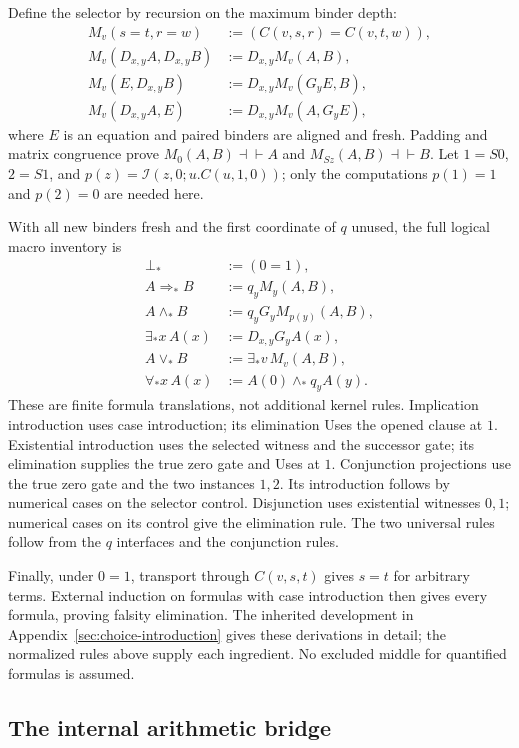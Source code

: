 \documentclass[11pt]{article}
\theoremstyle{definition}
\newcommand{\si}{\mathcal I}
\begin{document}
Define the selector by recursion on the maximum binder depth:
\[
\begin{aligned}
M_v(s=t,r=w)&:=(C(v,s,r)=C(v,t,w)),\\
M_v(D_{x,y}A,D_{x,y}B)&:=D_{x,y}M_v(A,B),\\
M_v(E,D_{x,y}B)&:=D_{x,y}M_v(G_yE,B),\\
M_v(D_{x,y}A,E)&:=D_{x,y}M_v(A,G_yE),
\end{aligned}
\]
where $E$ is an equation and paired binders are aligned and fresh.
Padding and matrix congruence prove
$M_0(A,B)\dashv\vdash A$ and $M_{Sz}(A,B)\dashv\vdash B$.
Let $1=S0$, $2=S1$, and
$p(z)=\si(z,0;u.C(u,1,0))$; only the computations
$p(1)=1$ and $p(2)=0$ are needed here.

With all new binders fresh and the first coordinate of $q$ unused,
the full logical macro inventory is
\[
\begin{aligned}
\bot_*&:=(0=1),\\
A\Rightarrow_*B&:=q_yM_y(A,B),\\
A\wedge_*B&:=q_yG_yM_{p(y)}(A,B),\\
\exists_*x\,A(x)&:=D_{x,y}G_yA(x),\\
A\vee_*B&:=\exists_*v\,M_v(A,B),\\
\forall_*x\,A(x)&:=A(0)\wedge_*q_yA(y).
\end{aligned}
\]
These are finite formula translations, not additional kernel rules.
Implication introduction uses case introduction; its elimination Uses the
opened clause at $1$. Existential introduction uses the selected witness
and the successor gate; its elimination supplies the true zero gate and
Uses at $1$. Conjunction projections use the true zero gate and the two
instances $1,2$. Its introduction follows by numerical cases on the
selector control. Disjunction uses existential witnesses $0,1$; numerical
cases on its control give the elimination rule. The two universal rules
follow from the $q$ interfaces and the conjunction rules.

Finally, under $0=1$, transport through $C(v,s,t)$ gives $s=t$ for
arbitrary terms. External induction on formulas with case introduction
then gives every formula, proving falsity elimination. The inherited
development in Appendix~\ref{sec:choice-introduction} gives these
derivations in detail; the normalized rules above supply each ingredient.
No excluded middle for quantified formulas is assumed.

\subsection{The internal arithmetic bridge}
\end{document}
